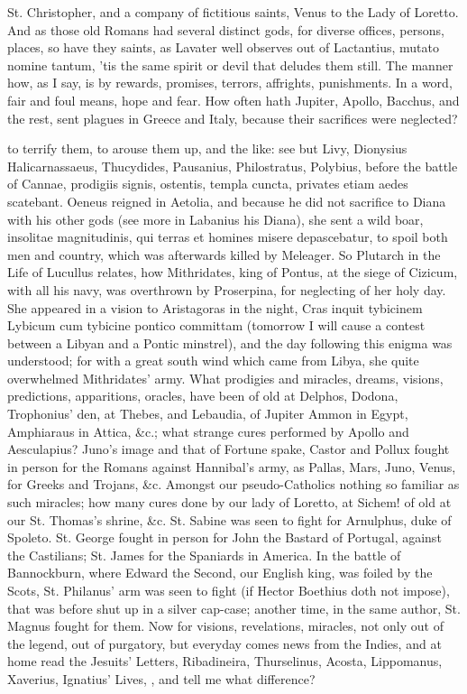 {St. Christopher, and a company of fictitious saints, Venus to the Lady
of Loretto. And as those old Romans had several distinct gods, for
diverse offices, persons, places, so have they saints, as Lavater
well observes out of Lactantius, mutato nomine tantum, 'tis the same
spirit or devil that deludes them still. The manner how, as I say, is
by rewards, promises, terrors, affrights, punishments. In a word, fair
and foul means, hope and fear. How often hath Jupiter, Apollo, Bacchus,
and the rest, sent plagues in Greece and Italy, because their
sacrifices were neglected?

to terrify them, to arouse them up, and the like: see but Livy,
Dionysius Halicarnassaeus, Thucydides, Pausanius, Philostratus,
Polybius, before the battle of Cannae, prodigiis signis,
ostentis, templa cuncta, privates etiam aedes scatebant. Oeneus reigned
in Aetolia, and because he did not sacrifice to Diana with his other
gods (see more in Labanius his Diana), she sent a wild boar, insolitae
magnitudinis, qui terras et homines misere depascebatur, to spoil both
men and country, which was afterwards killed by Meleager. So Plutarch
in the Life of Lucullus relates, how Mithridates, king of Pontus, at
the siege of Cizicum, with all his navy, was overthrown by Proserpina,
for neglecting of her holy day. She appeared in a vision to Aristagoras
in the night, Cras inquit tybicinem Lybicum cum tybicine pontico
committam (tomorrow I will cause a contest between a Libyan and a
Pontic minstrel), and the day following this enigma was understood; for
with a great south wind which came from Libya, she quite overwhelmed
Mithridates' army. What prodigies and miracles, dreams, visions,
predictions, apparitions, oracles, have been of old at Delphos, Dodona,
Trophonius' den, at Thebes, and Lebaudia, of Jupiter Ammon in Egypt,
Amphiaraus in Attica, \&c.; what strange cures performed by Apollo and
Aesculapius? Juno's image and that of Fortune spake, Castor
and Pollux fought in person for the Romans against Hannibal's army, as
Pallas, Mars, Juno, Venus, for Greeks and Trojans, \&c. Amongst our
pseudo-Catholics nothing so familiar as such miracles; how many cures
done by our lady of Loretto, at Sichem! of old at our St. Thomas's
shrine, \&c. St. Sabine was seen to fight for Arnulphus, duke of
Spoleto. St. George fought in person for John the Bastard of
Portugal, against the Castilians; St. James for the Spaniards in
America. In the battle of Bannockburn, where Edward the Second, our
English king, was foiled by the Scots, St. Philanus' arm was seen to
fight (if Hector Boethius doth not impose), that was before shut
up in a silver cap-case; another time, in the same author, St. Magnus
fought for them. Now for visions, revelations, miracles, not only out
of the legend, out of purgatory, but everyday comes news from the
Indies, and at home read the Jesuits' Letters, Ribadineira,
Thurselinus, Acosta, Lippomanus, Xaverius, Ignatius' Lives, \etc{}, and
tell me what difference?

}
